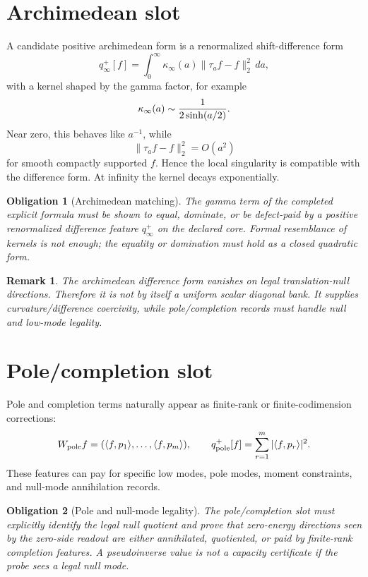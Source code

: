 \documentclass[11pt]{article}
\newtheorem{remark}{Remark}
\newtheorem{obligation}{Obligation}
\begin{document}
\section{Archimedean slot}
A candidate positive archimedean form is a renormalized shift-difference form
\[
  q_\infty^+[f]
  =\int_0^\infty \kappa_\infty(a)\|\tau_a f-f\|_2^2\,da,
\]
with a kernel shaped by the gamma factor, for example
\[
  \kappa_\infty(a)\sim {1\over 2\sinh(a/2)}.
\]
Near zero, this behaves like \(a^{-1}\), while
\[
  \|\tau_a f-f\|_2^2=O(a^2)
\]
for smooth compactly supported \(f\).  Hence the local singularity is compatible with the difference form.  At infinity the kernel decays exponentially.

\begin{obligation}[Archimedean matching]
The gamma term of the completed explicit formula must be shown to equal, dominate, or be defect-paid by a positive renormalized difference feature \(q_\infty^+\) on the declared core.  Formal resemblance of kernels is not enough; the equality or domination must hold as a closed quadratic form.
\end{obligation}

\begin{remark}
The archimedean difference form vanishes on legal translation-null directions.  Therefore it is not by itself a uniform scalar diagonal bank.  It supplies curvature/difference coercivity, while pole/completion records must handle null and low-mode legality.
\end{remark}

\section{Pole/completion slot}
Pole and completion terms naturally appear as finite-rank or finite-codimension corrections:
\[
  W_{\rm pole}f=(\langle f,p_1\rangle,\ldots,\langle f,p_m\rangle),
  \qquad
  q_{\rm pole}^+[f]=\sum_{r=1}^m |\langle f,p_r\rangle|^2.
\]
These features can pay for specific low modes, pole modes, moment constraints, and null-mode annihilation records.

\begin{obligation}[Pole and null-mode legality]
The pole/completion slot must explicitly identify the legal null quotient and prove that zero-energy directions seen by the zero-side readout are either annihilated, quotiented, or paid by finite-rank completion features.  A pseudoinverse value is not a capacity certificate if the probe sees a legal null mode.
\end{obligation}
\end{document}
